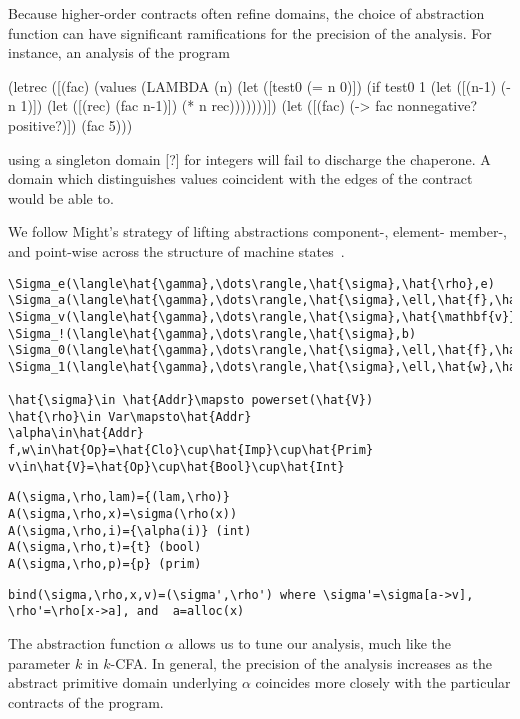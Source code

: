 \documentclass{sigplanconf}
\begin{document}
Because higher-order contracts often refine domains, the choice of abstraction function can have significant ramifications for the precision of the analysis.
For instance, an analysis of the program
\begin{schemedisplay}
(letrec ([(fac) (values (LAMBDA (n)
                          (let ([test0 (= n 0)])
                            (if test0
                                1
                                (let ([(n-1) (- n 1)])
                                  (let ([(rec) (fac n-1)])
                                    (* n rec)))))))])
  (let ([(fac) (-> fac nonnegative? positive?)])
    (fac 5)))
\end{schemedisplay}
using a singleton domain [?] for integers will fail to discharge the chaperone.
A domain which distinguishes values coincident with the edges of the contract would be able to.

We follow Might's strategy of lifting abstractions component-, element- member-, and point-wise across the structure of machine states~\cite{van2010abstracting}.

\begin{verbatim}
\Sigma_e(\langle\hat{\gamma},\dots\rangle,\hat{\sigma},\hat{\rho},e)
\Sigma_a(\langle\hat{\gamma},\dots\rangle,\hat{\sigma},\ell,\hat{f},\hat{\mathbf{v}})
\Sigma_v(\langle\hat{\gamma},\dots\rangle,\hat{\sigma},\hat{\mathbf{v}})
\Sigma_!(\langle\hat{\gamma},\dots\rangle,\hat{\sigma},b)
\Sigma_0(\langle\hat{\gamma},\dots\rangle,\hat{\sigma},\ell,\hat{f},\hat{w},\hat{\mathbf{v}})
\Sigma_1(\langle\hat{\gamma},\dots\rangle,\hat{\sigma},\ell,\hat{w},\hat{\mathbf{v}})

\hat{\sigma}\in \hat{Addr}\mapsto powerset(\hat{V})
\hat{\rho}\in Var\mapsto\hat{Addr}
\alpha\in\hat{Addr}
f,w\in\hat{Op}=\hat{Clo}\cup\hat{Imp}\cup\hat{Prim}
v\in\hat{V}=\hat{Op}\cup\hat{Bool}\cup\hat{Int}
\end{verbatim}

\begin{verbatim}
A(\sigma,\rho,lam)={(lam,\rho)}
A(\sigma,\rho,x)=\sigma(\rho(x))
A(\sigma,\rho,i)={\alpha(i)} (int)
A(\sigma,\rho,t)={t} (bool)
A(\sigma,\rho,p)={p} (prim)
\end{verbatim}

\begin{verbatim}
bind(\sigma,\rho,x,v)=(\sigma',\rho') where \sigma'=\sigma[a->v], \rho'=\rho[x->a], and  a=alloc(x)
\end{verbatim}

The abstraction function $\alpha$ allows us to tune our analysis, much like the parameter $k$ in $k$-CFA.
In general, the precision of the analysis increases as the abstract primitive domain underlying $\alpha$ coincides more closely with the particular contracts of the program.
\end{document}
